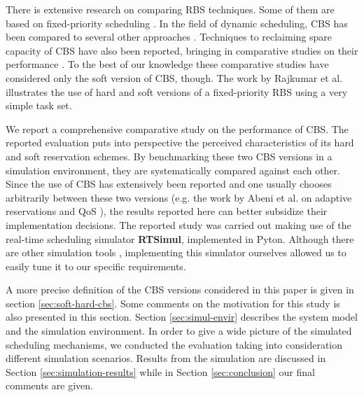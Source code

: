 \documentclass[times, 10pt,twocolumn]{article}
\newcommand{\simul}{\textbf{RTSimul}} %
\begin{document}

There is extensive research on comparing RBS
techniques.  Some of them are based on fixed-priority scheduling
\cite{bernat.ea99:new,bernat.ea02:multiple,davis.ea05:hierarchical,davis.ea95:dual}.
In the field of dynamic scheduling, CBS has been compared to several
other approaches \cite{spuri.ea96:scheduling}.  Techniques to
reclaiming spare capacity of CBS have also been reported, bringing in
comparative studies on their performance
\cite{caccamo.ea00:capacity,lin.ea05:improving}. To the best of our
knowledge these comparative studies have considered only the soft
version of CBS, though.  The work by Rajkumar et
al. \cite{rajkumar.ea01:resource} illustrates the use of hard and soft
versions of a fixed-priority RBS using a very simple task set.

\label{sec:contr-this-paper}

We report a comprehensive comparative study on the performance of
CBS. The reported evaluation puts into perspective the perceived
characteristics of its hard and soft reservation schemes.  By
benchmarking these two CBS versions in a simulation environment, they
are systematically compared against each other.  Since the use of CBS
has extensively been reported and one usually chooses arbitrarily
between these two versions (e.g. the work by Abeni et al. on adaptive
reservations and QoS \cite{abeni.ea99:adaptive,abeni.ea05:qos}), the
results reported here can better subsidize their implementation
decisions.  The reported study was carried out making use of the
real-time scheduling simulator \simul{}, implemented in
Pyton. Although there are other simulation tools
\cite{ancilotti.ea96:flexible}, implementing this simulator ourselves
allowed us to easily tune it to our specific requirements.

\label{sec:structure-this-paper}

A more precise definition of the CBS versions considered in this
paper is given in section \ref{sec:soft-hard-cbs}. Some comments on the motivation for 
this study is also presented in this section.  
Section \ref{sec:simul-envir} describes the system model and the
simulation environment.  In order to give a wide picture of the
simulated scheduling mechanisms, we conducted the evaluation taking
into consideration different simulation scenarios. Results from the
simulation are discussed in Section \ref{sec:simulation-results} while
in Section \ref{sec:conclusion} our final comments are given.
\end{document}
